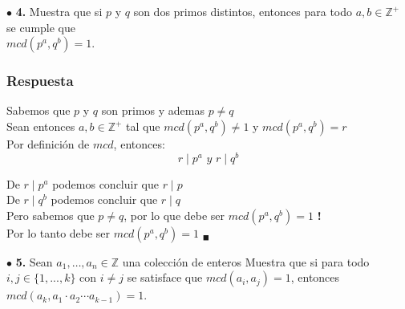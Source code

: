 \documentclass[12pt]{article}
\begin{document}
	\vspace{1cm}
	
	$\bullet$ \textbf{4.} Muestra que si $p$ y $q$ son dos primos distintos, entonces para todo $a, b \in \mathbb{Z}^+$ se cumple que\\
	$mcd(p^a, q^b) = 1$.
	\subsubsection*{Respuesta}
	Sabemos que $p$ y $q$ son primos y ademas $p \neq q$\\

	Sean entonces $a, b \in \mathbb{Z}^+$ tal que $mcd(p^a, q^b) \neq 1$ y $mcd(p^a, q^b) = r$\\

	Por definición de $mcd$, entonces:
	\[r \mid p^a \textit{ y } r \mid q^b\]

	De $r \mid p^a$ podemos concluir que $r \mid p$\\

	De $r \mid q^b$ podemos concluir que $r \mid q$ \\
	
	Pero sabemos que $p \neq q$, por lo que debe ser $mcd(p^a, q^b) = 1$ \textbf{!}\\

	Por lo tanto debe ser $mcd(p^a, q^b) = 1$ $_\blacksquare$
	
	\vspace{1cm}
	
	$\bullet$ \textbf{5.} Sean $a_1, \dots, a_n \in \mathbb{Z}$ una colección de enteros Muestra que si para todo $i, j \in \{1, . . . , k \}$ 
	con $i \neq j$ se satisface que $mcd(a_i, a_j ) = 1$, entonces $mcd(a_k , a_1  \cdot a_2 \cdots a_{k-1}) = 1$.
	
\end{document}
